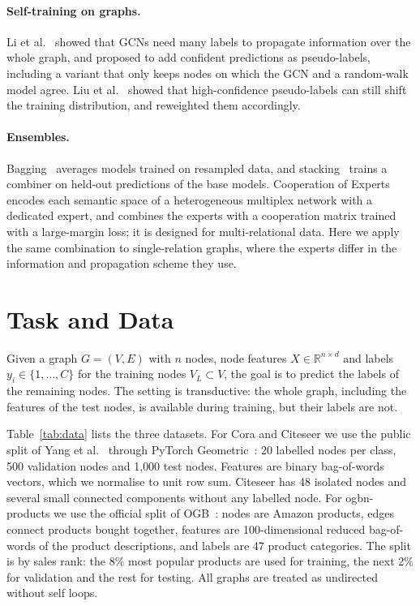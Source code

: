 \documentclass[sigconf,nonacm]{acmart}
\begin{document}
\paragraph{Self-training on graphs.}
Li et al.~\cite{li2018deeper} showed that GCNs need many labels to propagate information over the whole graph, and proposed to add confident predictions as pseudo-labels, including a variant that only keeps nodes on which the GCN and a random-walk model agree.
Liu et al.~\cite{liu2022drgst} showed that high-confidence pseudo-labels can still shift the training distribution, and reweighted them accordingly.

\paragraph{Ensembles.}
Bagging~\cite{breiman1996bagging} averages models trained on resampled data, and stacking~\cite{wolpert1992stacking} trains a combiner on held-out predictions of the base models.
Cooperation of Experts~\cite{wang2025coe} encodes each semantic space of a heterogeneous multiplex network with a dedicated expert, and combines the experts with a cooperation matrix trained with a large-margin loss; it is designed for multi-relational data.
Here we apply the same combination to single-relation graphs, where the experts differ in the information and propagation scheme they use.

\section{Task and Data}

Given a graph $G=(V,E)$ with $n$ nodes, node features $X\in\mathbb{R}^{n\times d}$ and labels $y_i\in\{1,\dots,C\}$ for the training nodes $V_L\subset V$, the goal is to predict the labels of the remaining nodes.
The setting is transductive: the whole graph, including the features of the test nodes, is available during training, but their labels are not.

Table~\ref{tab:data} lists the three datasets.
For Cora and Citeseer we use the public split of Yang et al.~\cite{yang2016planetoid} through PyTorch Geometric~\cite{fey2019pyg}: 20 labelled nodes per class, 500 validation nodes and 1{,}000 test nodes.
Features are binary bag-of-words vectors, which we normalise to unit row sum.
Citeseer has 48 isolated nodes and several small connected components without any labelled node.
For ogbn-products we use the official split of OGB~\cite{hu2020ogb}: nodes are Amazon products, edges connect products bought together, features are 100-dimensional reduced bag-of-words of the product descriptions, and labels are 47 product categories.
The split is by sales rank: the 8\% most popular products are used for training, the next 2\% for validation and the rest for testing.
All graphs are treated as undirected without self loops.
\end{document}

